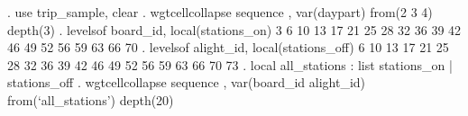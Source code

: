 . use trip_sample, clear
{\smallskip}
. wgtcellcollapse sequence , var(daypart) from(2 3 4) depth(3)
{\smallskip}
. levelsof board_id, local(stations_on)
3 6 10 13 17 21 25 28 32 36 39 42 46 49 52 56 59 63 66 70
{\smallskip}
. levelsof alight_id, local(stations_off)
6 10 13 17 21 25 28 32 36 39 42 46 49 52 56 59 63 66 70 73
{\smallskip}
. local all_stations : list stations_on | stations_off
{\smallskip}
. wgtcellcollapse sequence , var(board_id alight_id) from(`all_stations') depth(20)
{\smallskip}

